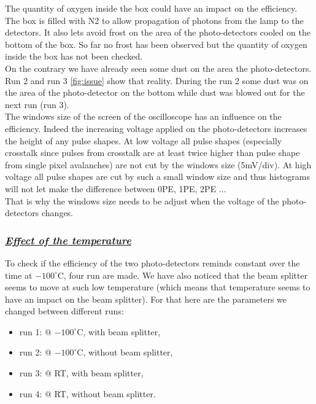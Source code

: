 \documentclass[a4paper, 11pt]{report}%
\begin{document}
  The quantity of oxygen inside the box could have an impact on the efficiency. The box is filled with N2 to allow propagation of photons
  from the lamp to the detectors. It also lets avoid frost on the area of the photo-detectors cooled on the bottom of the box. 
  So far no frost has been observed but the quantity of oxygen inside the box has not been checked. 
  \\
  
  On the contrary we have already seen some dust on the area the photo-detectors. Run 2 and run 3 \ref{fig:issue} show that reality. During the 
  run 2 some dust was on the area of the photo-detector on the bottom while dust was blowed out for the next run (run 3). 
  \\
  
  The windows size of the screen of the oscilloscope has an influence on the efficiency. Indeed the increasing voltage applied on 
  the photo-detectors increases the height of any pulse shapes. At low voltage all pulse shapes (especially crosstalk since pulses 
  from crosstalk are at least twice higher than 
  pulse shape from single pixel avalanches) are not cut by the windows size (5mV/div). At high voltage all pulse shapes are cut 
  by such a small window size and thus histograms will not let make the difference between 0PE, 1PE, 2PE ...\\
  That is why the windows size needs to be adjust when the voltage of the photo-detectors changes.
  
  \subsubsection{\textit{\underline{Effect of the temperature}}}

  
  To check if the efficiency of the two photo-detectors reminds constant over the time at $-100^\circ$C, four run are made. 
  We have also 
  noticed that the beam splitter seems to move at such low temperature (which means that temperature seems to have an impact on the 
  beam splitter). For that here are the parameters we changed between different runs:
  
  \begin{itemize}
   \item run 1: @ $-100^\circ$C, with beam splitter,
   \item run 2: @ $-100^\circ$C, without beam splitter,
   \item run 3: @ RT, with beam splitter,
   \item run 4: @ RT, without beam splitter.
  \end{itemize}
\end{document}
